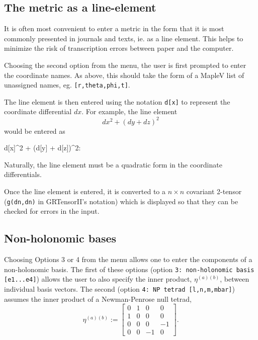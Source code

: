 \documentclass{article}
\begin{document}
\subsection{The metric as a line-element}
%
It is often most convenient to enter a metric in the form that it is
most commonly presented in journals and texts, ie. as a line element.
This helps to minimize the risk of transcription errors between paper and
the computer.

Choosing the second option from the  menu, the user is
first prompted to enter the coordinate names. As above, this should
take the form of a MapleV list of unassigned names,
eg. \texttt{[r,theta,phi,t]}.

The line element is then entered using the notation \texttt{d[x]} to 
represent the coordinate differential $dx$. For example, the line element
\[
  dx^2 + (dy + dz)^2
\]
would be entered as
\begin{center}
  \begin{texttt}
    d[x]\^{}2 + (d[y] + d[z])\^{}2:
  \end{texttt}
\end{center}
Naturally, the line element must be a quadratic form in the coordinate
differentials.

Once the line element is entered, it is converted to a $n\times n$
covariant 2-tensor (\texttt{g(dn,dn)} in GRTensorII's notation) which
is displayed so that they can be checked for errors in the input.
%
\subsection{Non-holonomic bases}
%
Choosing Options 3 or 4 from the  menu allows one to
enter the components of a non-holonomic basis. The first of these
options (option \texttt{3: non-holonomic basis [e1...e4]}) allows the
user to also specify the inner product, $\eta^{(a)(b)}$, between
individual basis vectors. The second (option \texttt{4: NP tetrad
[l,n,m,mbar]}) assumes the inner product of a Newman-Penrose
null tetrad,
\begin{equation}
  \eta^{(a)(b)} :=
    \left[
      \begin{array}{cccc}
        0 & 1 & 0 & 0 \\
        1 & 0 & 0 & 0 \\
        0 & 0 & 0 &-1 \\
        0 & 0 &-1 & 0
      \end{array}
    \right].
  \label{eq:nullip}
\end{equation}
\end{document}
